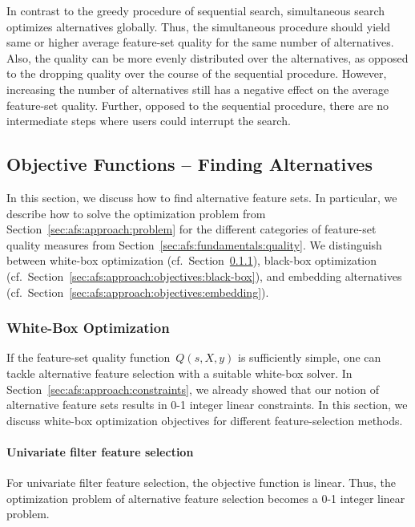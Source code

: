 \documentclass{article}
\theoremstyle{definition}
\begin{document}
In contrast to the greedy procedure of sequential search, simultaneous search optimizes alternatives globally.
Thus, the simultaneous procedure should yield same or higher average feature-set quality for the same number of alternatives.
Also, the quality can be more evenly distributed over the alternatives, as opposed to the dropping quality over the course of the sequential procedure.
However, increasing the number of alternatives still has a negative effect on the average feature-set quality.
Further, opposed to the sequential procedure, there are no intermediate steps where users could interrupt the search.

\subsection{Objective Functions -- Finding Alternatives}
\label{sec:afs:approach:objectives}

In this section, we discuss how to find alternative feature sets.
In particular, we describe how to solve the optimization problem from Section~\ref{sec:afs:approach:problem} for the different categories of feature-set quality measures from Section~\ref{sec:afs:fundamentals:quality}.
We distinguish between white-box optimization (cf.~Section~\ref{sec:afs:approach:objectives:white-box}), black-box optimization (cf.~Section~\ref{sec:afs:approach:objectives:black-box}), and embedding alternatives (cf.~Section~\ref{sec:afs:approach:objectives:embedding}).

\subsubsection{White-Box Optimization}
\label{sec:afs:approach:objectives:white-box}

If the feature-set quality function~$Q(s,X,y)$ is sufficiently simple, one can tackle alternative feature selection with a suitable white-box solver.
In Section~\ref{sec:afs:approach:constraints}, we already showed that our notion of alternative feature sets results in 0-1 integer linear constraints.
In this section, we discuss white-box optimization objectives for different feature-selection methods.

\paragraph{Univariate filter feature selection}

For univariate filter feature selection, the objective function is linear.
Thus, the optimization problem of alternative feature selection becomes a 0-1 integer linear problem.
\end{document}
